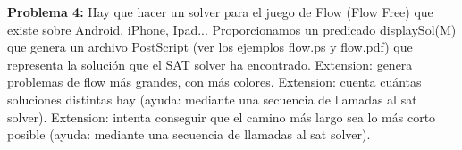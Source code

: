 \documentclass[11pt]{article}
\begin{document}
\textbf{Problema 4:} Hay que hacer un solver para el juego de Flow (Flow Free) que existe sobre Android,
iPhone, Ipad... Proporcionamos un predicado displaySol(M) que genera un archivo PostScript (ver los ejemplos flow.ps y flow.pdf) que
representa la solución que el SAT solver ha encontrado. Extension: genera problemas de flow más grandes, con más colores.
Extension: cuenta cuántas soluciones distintas hay (ayuda: mediante una secuencia de llamadas al sat solver).
Extension: intenta conseguir que el camino más largo sea lo más corto posible (ayuda: mediante una secuencia de llamadas al sat solver).
\end{document}
